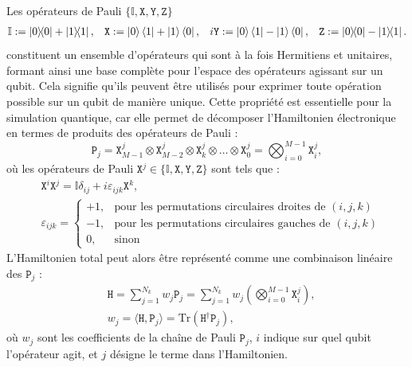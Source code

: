 \documentclass[12pt,a4paper,svgnames,x11names,rgb,table]{article} %
\numberwithin{equation}{section} %
\numberwithin{figure}{section} %
\numberwithin{table}{section} %
\begin{document}
Les opérateurs de Pauli $\{\mathbb{I}, \mathtt{X}, \mathtt{Y}, \mathtt{Z}\}$ 
\begin{align}\label{eq:pauli_matrices}
& \mathbb{I} := \op{0} + \op{1},
&& \mathtt{X} := \ket{0}\bra{1} + \ket{1}\bra{0}, 
&& i \mathtt{Y} := \ket{0}\bra{1} - \ket{1}\bra{0}, 
& \mathtt{Z} := \op{0} - \op{1}.
\end{align}
constituent un ensemble d'opérateurs qui sont à la fois Hermitiens et unitaires, formant ainsi une base complète pour l'espace des opérateurs agissant sur un qubit. Cela signifie qu'ils peuvent être utilisés pour exprimer toute opération possible sur un qubit de manière unique. Cette propriété est essentielle pour la simulation quantique, car elle permet de décomposer l'Hamiltonien électronique en termes de produits des opérateurs de Pauli :
\begin{equation}\label{eq:pauli_decomposition}
\mathtt{P}_j = \mathtt{X}_{M-1}^j \otimes \mathtt{X}_{M-2}^j \otimes \mathtt{X}_k^j \otimes \dots \otimes \mathtt{X}_0^j = \bigotimes_{i=0}^{M-1} \mathtt{X}_i^j,
\end{equation}
où les opérateurs de Pauli $\mathtt{X}^j \in \{\mathbb{I}, \mathtt{X}, \mathtt{Y}, \mathtt{Z}\}$ sont tels que :
\begin{equation}\label{eq:pauli_algebra}
\begin{aligned}
& \mathtt{X}^i \mathtt{X}^j = \mathbb{I} \delta_{ij} + i \varepsilon_{ijk} \mathtt{X}^k, \\
& \varepsilon_{ijk} = 
\begin{cases}
+1, & \text{pour les permutations circulaires droites de } (i, j, k) \\
-1, & \text{pour les permutations circulaires gauches de } (i, j, k) \\
0, & \text{sinon}
\end{cases}
\end{aligned}
\end{equation}
L'Hamiltonien total peut alors être représenté comme une combinaison linéaire des $\mathtt{P}_j$ :
\begin{align}\label{eq:hamiltonian_pauli}
& \mathtt{H} = \sum_{j=1}^{N_k} w_j \mathtt{P}_j = \sum_{j=1}^{N_k} w_j \left( \bigotimes_{i=0}^{M-1} \mathtt{X}_i^j \right), \\
& w_j = \langle \mathtt{H}, \mathtt{P}_j \rangle = \text{Tr}(\mathtt{H}^\dagger \mathtt{P}_j),
\end{align}
où $w_j$ sont les coefficients de la chaîne de Pauli $\mathtt{P}_j$, $i$ indique sur quel qubit l'opérateur agit, et $j$ désigne le terme dans l'Hamiltonien.
\end{document}

